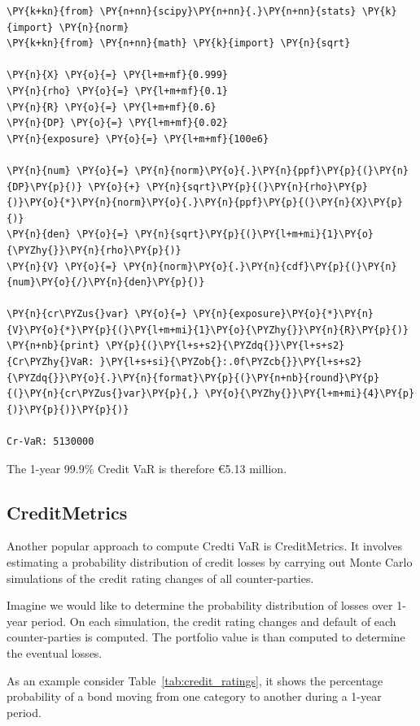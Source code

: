 \begin{tcolorbox}[breakable, size=fbox, boxrule=1pt, pad at break*=1mm,colback=cellbackground, colframe=cellborder]
\begin{Verbatim}[commandchars=\\\{\}]
\PY{k+kn}{from} \PY{n+nn}{scipy}\PY{n+nn}{.}\PY{n+nn}{stats} \PY{k}{import} \PY{n}{norm}
\PY{k+kn}{from} \PY{n+nn}{math} \PY{k}{import} \PY{n}{sqrt}
		
\PY{n}{X} \PY{o}{=} \PY{l+m+mf}{0.999}
\PY{n}{rho} \PY{o}{=} \PY{l+m+mf}{0.1}
\PY{n}{R} \PY{o}{=} \PY{l+m+mf}{0.6}
\PY{n}{DP} \PY{o}{=} \PY{l+m+mf}{0.02}
\PY{n}{exposure} \PY{o}{=} \PY{l+m+mf}{100e6}
		
\PY{n}{num} \PY{o}{=} \PY{n}{norm}\PY{o}{.}\PY{n}{ppf}\PY{p}{(}\PY{n}{DP}\PY{p}{)} \PY{o}{+} \PY{n}{sqrt}\PY{p}{(}\PY{n}{rho}\PY{p}{)}\PY{o}{*}\PY{n}{norm}\PY{o}{.}\PY{n}{ppf}\PY{p}{(}\PY{n}{X}\PY{p}{)}
\PY{n}{den} \PY{o}{=} \PY{n}{sqrt}\PY{p}{(}\PY{l+m+mi}{1}\PY{o}{\PYZhy{}}\PY{n}{rho}\PY{p}{)}
\PY{n}{V} \PY{o}{=} \PY{n}{norm}\PY{o}{.}\PY{n}{cdf}\PY{p}{(}\PY{n}{num}\PY{o}{/}\PY{n}{den}\PY{p}{)}
		
\PY{n}{cr\PYZus{}var} \PY{o}{=} \PY{n}{exposure}\PY{o}{*}\PY{n}{V}\PY{o}{*}\PY{p}{(}\PY{l+m+mi}{1}\PY{o}{\PYZhy{}}\PY{n}{R}\PY{p}{)}
\PY{n+nb}{print} \PY{p}{(}\PY{l+s+s2}{\PYZdq{}}\PY{l+s+s2}{Cr\PYZhy{}VaR: }\PY{l+s+si}{\PYZob{}:.0f\PYZcb{}}\PY{l+s+s2}{\PYZdq{}}\PY{o}{.}\PY{n}{format}\PY{p}{(}\PY{n+nb}{round}\PY{p}{(}\PY{n}{cr\PYZus{}var}\PY{p}{,} \PY{o}{\PYZhy{}}\PY{l+m+mi}{4}\PY{p}{)}\PY{p}{)}\PY{p}{)}

Cr-VaR: 5130000
\end{Verbatim}
\end{tcolorbox}
The 1-year 99.9\% Credit VaR is therefore \euro{5.13} million.

\subsection{CreditMetrics}
Another popular approach to compute Credti VaR is CreditMetrics. It involves estimating a probability distribution of credit losses by carrying out Monte Carlo simulations of the credit rating changes of all counter-parties.

Imagine we would like to determine the probability distribution of losses over 1-year period. On each simulation, the credit rating changes and default of each counter-parties is computed. The portfolio value is than computed to determine the eventual losses. 

As an example consider Table~\ref{tab:credit_ratings}, it shows the percentage probability of a bond moving from one category to another during a 1-year period.

